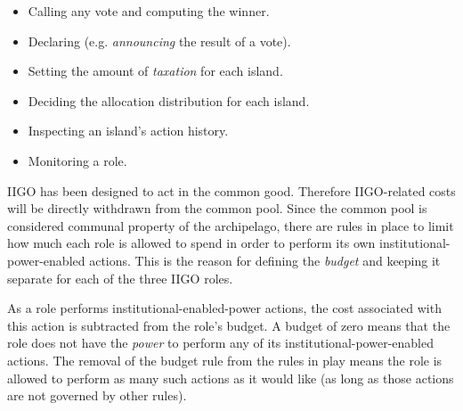 

\begin{itemize}
\item Calling any vote and computing the winner.
\item Declaring (e.g. \textit{announcing} the result of a vote).
\item Setting the amount of \emph{taxation} for each island.
\item Deciding the allocation distribution for each island.
\item Inspecting an island's action history.
\item Monitoring a role.
\end{itemize}

IIGO has been designed to act in the common good. Therefore IIGO-related costs will be directly withdrawn from the common pool. Since the common pool is considered communal property of the archipelago, there are rules in place to limit how much each role is allowed to spend in order to perform its own institutional-power-enabled actions. This is the reason for defining the \emph{budget} and keeping it separate for each of the three IIGO roles.


As a role performs institutional-enabled-power actions, the cost associated with this action is subtracted from the role's budget. A budget of zero means that the role does not have the \emph{power} to perform any of its institutional-power-enabled actions. The removal of the budget rule from the rules in play means the role is allowed to perform as many such actions as it would like (as long as those actions are not governed by other rules). 




